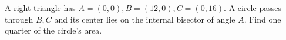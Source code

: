 A right triangle has $ A=(0,0),B=(12,0),C=(0,16)$. A circle passes through $ B,C $ and its center lies on the internal bisector of angle $ A $. Find one quarter of the circle's area.
